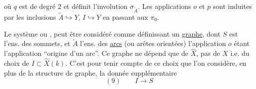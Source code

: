 où $q$ est de degré $2$ et définit l'involution $\sigma_{\widetilde A}$. Les applications $o$ et $p$ sont induites par les inclusions $\widetilde A\hookrightarrow Y$, $I\hookrightarrow Y$ en passant aux $\pi_0$.

Le système
ou
, peut être considéré comme définissant un \uline{graphe}, dont $S$ est l'ens. des sommets, et $\widetilde A$ l'ens. des \uline{arcs} (ou arêtes orientées) l'application $o$ étant l'application ``origine d'un arc''. Ce graphe ne dépend que de $\widehat X$, pas de $X$ i.e. du choix de $I\subset\widehat X(k)$. C'est pour tenir compte de ce choix que l'on considère, en plus de la structure de graphe, la donnée supplémentaire
\[
(9)\qquad I\longrightarrow S
\]
